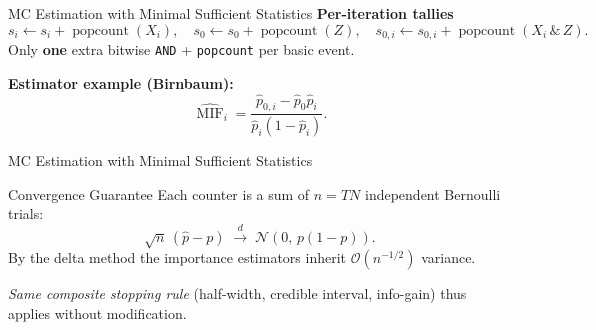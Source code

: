 \begin{frame}{MC Estimation with Minimal Sufficient Statistics}
    \textbf{Per-iteration tallies}
    \[
      s_i \!\leftarrow\! s_i + \operatorname{popcount}(X_i),\quad
      s_0 \!\leftarrow\! s_0 + \operatorname{popcount}(Z),\quad
      s_{0,i} \!\leftarrow\! s_{0,i} + \operatorname{popcount}(X_i \,\&\, Z).
    \]
    Only \textbf{one} extra bitwise \texttt{AND} + \texttt{popcount} per basic event.

    \vspace{4pt}
    \textbf{Estimator example (Birnbaum):}
    \[
      \widehat{\operatorname{MIF}}_i =
      \frac{\widehat p_{0,i} - \widehat p_0\widehat p_i}
           {\widehat p_i(1-\widehat p_i)}.
    \]
\end{frame}

\begin{frame}{MC Estimation with Minimal Sufficient Statistics}
    \begin{block}{Convergence Guarantee}
      Each counter is a sum of $n=TN$ independent Bernoulli trials:
      \[
        \sqrt{n}\,(\widehat p - p) \;\xrightarrow{d}\; \mathcal N(0,\,p(1-p)).
      \]
      By the delta method the importance estimators inherit $\mathcal O(n^{-1/2})$ variance.

      \vspace{4pt}
      \emph{Same composite stopping rule} (half-width, credible interval, info-gain) thus applies without modification.
    \end{block}
\end{frame}
